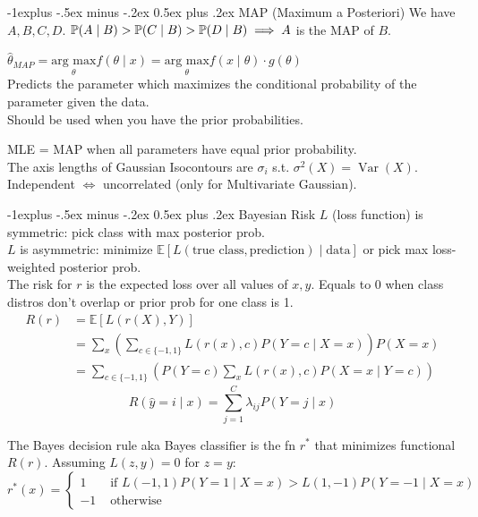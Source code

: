 \documentclass[10pt,landscape]{article}
\makeatletter
\DeclareMathOperator*{\Var}{Var}
\newcommand{\wrap}[3]{\left#1#3\right#2}
\def\P{\mathbb{P}}
\def\E{\mathbb{E}}
\renewcommand{\subsection}{\@startsection{subsection}{2}{0mm}%
                                {-1explus -.5ex minus -.2ex}%
                                {0.5ex plus .2ex}%
                                {\normalfont\normalsize\bfseries}}
\makeatother
\begin{document}
\begin{multicols}{3}
\subsection{MAP (Maximum a Posteriori)}
We have $A, B, C, D$. 
$\P(A \mid B) > \P(C \mid B) > \P(D \mid B)\newline\implies A$ is the MAP of $B$.

$\hat{\theta}_{MAP} = \underset{\theta}{\text{arg max}} f(\theta \mid x) = \underset{\theta}{\text{arg max}} f(x \mid \theta) \cdot g(\theta)$ \\

Predicts the parameter which maximizes the conditional
probability of the parameter given the data.
\\
Should be used when you have the prior probabilities.

MLE = MAP when all parameters have equal prior probability.
\\
The axis lengths of Gaussian Isocontours are $\sigma_i$ s.t. $\sigma^2(X)=\Var(X)$.
Independent $\Longleftrightarrow$ uncorrelated (only for Multivariate Gaussian).




\subsection{Bayesian Risk}
$L$ (loss function) is symmetric: pick class with max posterior prob.
\\
$L$ is asymmetric: minimize $\E[L(\text{true class}, \text{prediction}) \mid \text{data}]$ or pick max loss-weighted posterior prob.
\\

The risk for $r$ is the expected loss over all values of $x, y$. Equals to 0 when class distros don't overlap or prior prob for one class is 1.
{\small
  \begin{align*}
    R(r) &=\E[L(r(X), Y)] \\
    &=\sum_{x}\wrap(){\sum_{c\in\{-1,1\}} L(r(x), c) P(Y=c \mid X=x)} P(X=x) \\
    &=\sum_{c\in\{-1,1\}}\wrap(){ P(Y=c) \sum_{x} L(r(x), c) P(X=x \mid Y=c)}
  \end{align*}
}
\[
    R(\hat{y}=i \mid x)=\sum_{j=1}^{C} \lambda_{i j} P(Y=j \mid x)
\]

The Bayes decision rule aka Bayes classifier is the fn $r^{*}$ that minimizes functional $R(r)$. Assuming $L(z, y)=0$ for $z=y$:
{\scriptsize \[
r^{*}(x)=\left\{\begin{aligned}
1 & \text { if } L(-1,1) P(Y=1 \mid X=x)>L(1,-1) P(Y=-1 \mid X=x) \\
-1 & \text { otherwise }
\end{aligned}\right.
\]}



\end{multicols}
\end{document}
